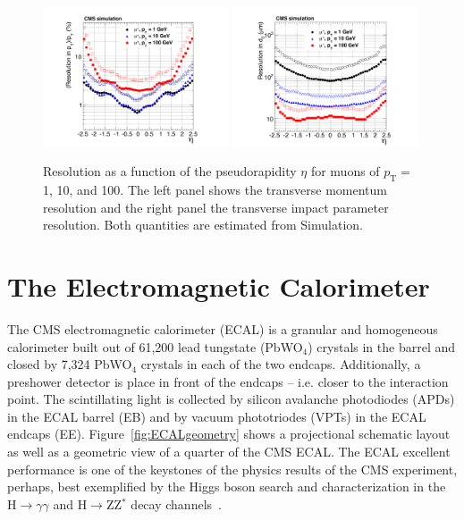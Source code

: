\begin{figure}
 \centering
\includegraphics[width=0.49\textwidth]{CMS_DetectorFigures/TrackerPtResolution.pdf}
\includegraphics[width=0.49\textwidth]{CMS_DetectorFigures/TrackerImpactParameterResolution.pdf}
 \caption{Resolution as a function of the pseudorapidity $\eta$ for
   muons of $p_{\mathrm{T}} = $ 1, 10, and 100\GeV. The left panel
   shows the transverse momentum resolution and the right panel the
   transverse impact parameter resolution. Both quantities are
   estimated from Simulation.\label{fig:MuonResolution}}
\end{figure}



\section{The Electromagnetic Calorimeter}
The CMS electromagnetic calorimeter (ECAL) is a granular and homogeneous
calorimeter built out of 61,200 lead tungstate (PbWO$_{4}$) crystals
in the barrel and closed by 7,324 PbWO$_{4}$ crystals in each of the
two endcaps. Additionally, a preshower detector is place in front of
the endcaps -- i.e. closer to the interaction point. The scintillating
light is collected by silicon avalanche photodiodes (APDs) in the ECAL barrel
(EB) and by vacuum phototriodes (VPTs) in the ECAL endcaps
(EE). Figure~\ref{fig:ECALgeometry} shows a projectional schematic
layout as well as a geometric view of a quarter of the CMS ECAL. The
ECAL excellent performance is one of the keystones of the physics
results of the CMS experiment, perhaps, best exemplified by the Higgs
boson search and characterization in the H$\rightarrow\gamma\gamma$
and H$\rightarrow$ZZ$^{*}$ decay channels~\cite{CMSHgg, CMSHzz}.

